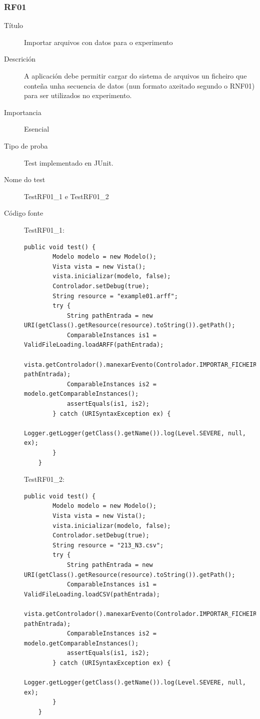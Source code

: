 \subsubsection*{RF01}
\begin{description}
\item[Título] \hfill
Importar arquivos con datos para o experimento
\item[Descrición] \hfill
A aplicación debe permitir cargar do sistema de arquivos un ficheiro que conteña unha secuencia de datos (nun formato axeitado segundo o RNF01) para ser utilizados no experimento.
\item[Importancia] \hfill
Esencial
\item[Tipo de proba] \hfill
Test implementado en JUnit.
\item[Nome do test] \hfill
TestRF01\_1 e TestRF01\_2
\item[Código fonte]
TestRF01\_1:
\begin{lstlisting}
public void test() {
        Modelo modelo = new Modelo();
        Vista vista = new Vista();
        vista.inicializar(modelo, false);
        Controlador.setDebug(true);
        String resource = "example01.arff";
        try {
            String pathEntrada = new URI(getClass().getResource(resource).toString()).getPath();
            ComparableInstances is1 = ValidFileLoading.loadARFF(pathEntrada);
            vista.getControlador().manexarEvento(Controlador.IMPORTAR_FICHEIRO, pathEntrada);
            ComparableInstances is2 = modelo.getComparableInstances();
            assertEquals(is1, is2);
        } catch (URISyntaxException ex) {
            Logger.getLogger(getClass().getName()).log(Level.SEVERE, null, ex);
        }
    }
\end{lstlisting}
TestRF01\_2:
\begin{lstlisting}
public void test() {
        Modelo modelo = new Modelo();
        Vista vista = new Vista();
        vista.inicializar(modelo, false);
        Controlador.setDebug(true);
        String resource = "213_N3.csv";
        try {
            String pathEntrada = new URI(getClass().getResource(resource).toString()).getPath();
            ComparableInstances is1 = ValidFileLoading.loadCSV(pathEntrada);
            vista.getControlador().manexarEvento(Controlador.IMPORTAR_FICHEIRO, pathEntrada);
            ComparableInstances is2 = modelo.getComparableInstances();
            assertEquals(is1, is2);
        } catch (URISyntaxException ex) {
            Logger.getLogger(getClass().getName()).log(Level.SEVERE, null, ex);
        }
    }

\end{lstlisting}
\end{description}

